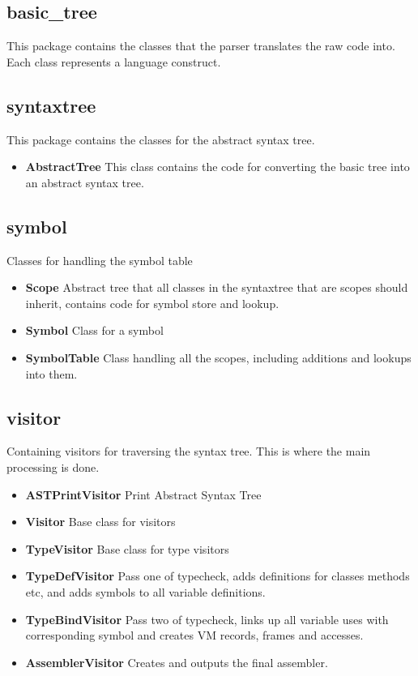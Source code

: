 \documentclass[a4paper,11pt]{article}
\begin{document}
  \subsection{basic\_tree}
     This package contains the classes that the parser translates the raw code into. Each class represents a language construct.

  \subsection{syntaxtree}
     This package contains the classes for the abstract syntax tree.
     \begin{itemize}
        \item \textbf{AbstractTree} This class contains the code for converting the basic tree into an abstract syntax tree.
     \end{itemize}

  \subsection{symbol}
     Classes for handling the symbol table
     \begin{itemize}
        \item \textbf{Scope} Abstract tree that all classes in the syntaxtree that are scopes should inherit, contains code for symbol store and lookup.
        \item \textbf{Symbol} Class for a symbol
        \item \textbf{SymbolTable} Class handling all the scopes, including additions and lookups into them.
     \end{itemize}

  \subsection{visitor}
     Containing visitors for traversing the syntax tree. This is where the main processing is done.
     \begin{itemize}
        \item \textbf{ASTPrintVisitor} Print Abstract Syntax Tree
        \item \textbf{Visitor} Base class for visitors
        \item \textbf{TypeVisitor} Base class for type visitors
        \item \textbf{TypeDefVisitor} Pass one of typecheck, adds definitions for classes methods etc, and adds symbols to all variable definitions.
        \item \textbf{TypeBindVisitor} Pass two of typecheck, links up all variable uses with corresponding symbol and creates VM records, frames and accesses.
        \item \textbf{AssemblerVisitor} Creates and outputs the final assembler.
     \end{itemize}
\end{document}
